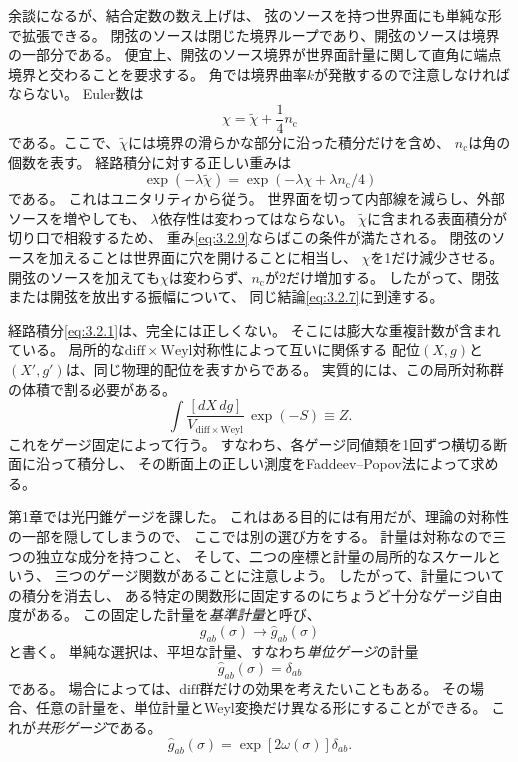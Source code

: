 余談になるが、結合定数の数え上げは、
弦のソースを持つ世界面にも単純な形で拡張できる。
閉弦のソースは閉じた境界ループであり、開弦のソースは境界の一部分である。
便宜上、開弦のソース境界が世界面計量に関して直角に端点境界と交わることを要求する。
角では境界曲率$k$が発散するので注意しなければならない。
Euler数は
\begin{equation}
\chi=\tilde\chi+\frac14n_{\mathrm c}
\tag{3.2.8}\label{eq:3.2.8}
\end{equation}
である。ここで、$\tilde\chi$には境界の滑らかな部分に沿った積分だけを含め、
$n_{\mathrm c}$は角の個数を表す。
経路積分に対する正しい重みは
\begin{equation}
\exp(-\lambda\tilde\chi)=\exp(-\lambda\chi+\lambda n_{\mathrm c}/4)
\tag{3.2.9}\label{eq:3.2.9}
\end{equation}
である。
これはユニタリティから従う。
世界面を切って内部線を減らし、外部ソースを増やしても、
$\lambda$依存性は変わってはならない。
$\tilde\chi$に含まれる表面積分が切り口で相殺するため、
重み\eqref{eq:3.2.9}ならばこの条件が満たされる。
閉弦のソースを加えることは世界面に穴を開けることに相当し、
$\chi$を1だけ減少させる。
開弦のソースを加えても$\chi$は変わらず、$n_{\mathrm c}$が2だけ増加する。
したがって、閉弦または開弦を放出する振幅について、
同じ結論\eqref{eq:3.2.7}に到達する。

\label{sec:3.3}

経路積分\eqref{eq:3.2.1}は、完全には正しくない。
そこには膨大な重複計数が含まれている。
局所的な$\mathrm{diff}\times\mathrm{Weyl}$対称性によって互いに関係する
配位$(X,g)$と$(X',g')$は、同じ物理的配位を表すからである。
実質的には、この局所対称群の体積で割る必要がある。
\begin{equation}
\int\frac{[dX\,dg]}{V_{\mathrm{diff}\times\mathrm{Weyl}}}\,\exp(-S)
\equiv Z.
\tag{3.3.1}\label{eq:3.3.1}
\end{equation}
これをゲージ固定によって行う。
すなわち、各ゲージ同値類を1回ずつ横切る断面に沿って積分し、
その断面上の正しい測度をFaddeev--Popov法によって求める。

第1章では光円錐ゲージを課した。
これはある目的には有用だが、理論の対称性の一部を隠してしまうので、
ここでは別の選び方をする。
計量は対称なので三つの独立な成分を持つこと、
そして、二つの座標と計量の局所的なスケールという、
三つのゲージ関数があることに注意しよう。
したがって、計量についての積分を消去し、
ある特定の関数形に固定するのにちょうど十分なゲージ自由度がある。
この固定した計量を\emph{基準計量}と呼び、
\begin{equation}
g_{ab}(\sigma)\longrightarrow\hat g_{ab}(\sigma)
\tag{3.3.2}\label{eq:3.3.2}
\end{equation}
と書く。
単純な選択は、平坦な計量、すなわち\emph{単位ゲージ}の計量
\begin{equation}
\hat g_{ab}(\sigma)=\delta_{ab}
\tag{3.3.3}\label{eq:3.3.3}
\end{equation}
である。
場合によっては、$\mathrm{diff}$群だけの効果を考えたいこともある。
その場合、任意の計量を、単位計量とWeyl変換だけ異なる形にすることができる。
これが\emph{共形ゲージ}である。
\begin{equation}
\hat g_{ab}(\sigma)=\exp[2\omega(\sigma)]\delta_{ab}.
\tag{3.3.4}\label{eq:3.3.4}
\end{equation}

